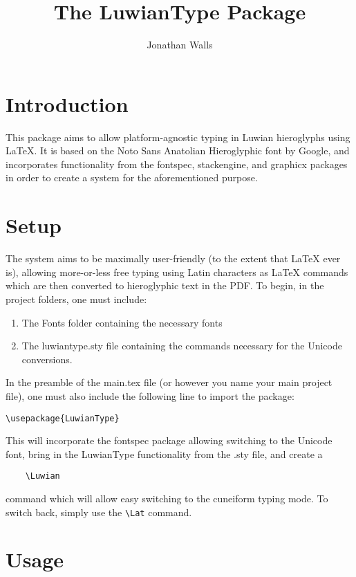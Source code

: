 \documentclass[12pt,A4]{article}
\title{The LuwianType Package}
\author{Jonathan Walls}
\begin{document}
\maketitle

\section{Introduction}

This package aims to allow platform-agnostic typing in Luwian hieroglyphs using LaTeX. It is based on the Noto Sans Anatolian Hieroglyphic font by Google, and incorporates functionality from the fontspec, stackengine, and graphicx packages in order to create a system for the aforementioned purpose.

\section{Setup}
The system aims to be maximally user-friendly (to the extent that LaTeX ever is), allowing more-or-less free typing using Latin characters as LaTeX commands which are then converted to hieroglyphic text in the PDF. To begin, in the project folders, one must include:
\begin{enumerate}
    \item The Fonts folder containing the necessary fonts
    \item The luwiantype.sty file containing the commands necessary for the Unicode conversions.
\end{enumerate}

In the preamble of the main.tex file (or however you name your main project file), one must also include the following line to import the package:\small
\begin{verbatim}
\usepackage{LuwianType}
\end{verbatim}
\normalsize\newpage
This will incorporate the fontspec package allowing switching to the Unicode font, bring in the LuwianType functionality from the .sty file, and create a 
\begin{verbatim}
    \Luwian
\end{verbatim} 
command which will allow easy switching to the cuneiform typing mode. To switch back, simply use the \verb|\Lat| command.

\section{Usage}
\end{document}
